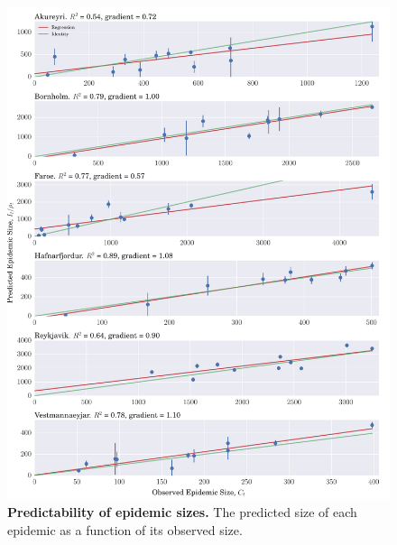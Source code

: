 \documentclass[10pt]{article}
\begin{document}
\begin{figure}[!h]
\centering
\includegraphics[width=\textwidth]{figures/4_sizes.pdf}
\caption{\textbf{Predictability of epidemic sizes.} The predicted size of each epidemic as a function of its observed size.}
\label{fig_sizes}
\end{figure}
\end{document}
